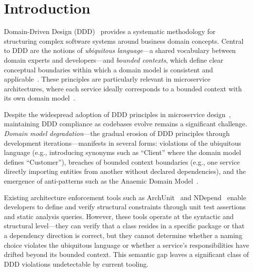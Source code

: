 \documentclass[smallextended]{svjour3}
\begin{document}
\section{Introduction}
\label{sec:intro}

Domain-Driven Design (DDD)~\cite{evans2003ddd} provides a systematic methodology for structuring complex software systems around business domain concepts.
Central to DDD are the notions of \emph{ubiquitous language}---a shared vocabulary between domain experts and developers---and \emph{bounded contexts}, which define clear conceptual boundaries within which a domain model is consistent and applicable~\cite{vernon2013implementing}.
These principles are particularly relevant in microservice architectures, where each service ideally corresponds to a bounded context with its own domain model~\cite{microsoft2024tactical}.

Despite the widespread adoption of DDD principles in microservice design~\cite{loukides2020microservices}, maintaining DDD compliance as codebases evolve remains a significant challenge.
\emph{Domain model degradation}---the gradual erosion of DDD principles through development iterations---manifests in several forms: violations of the ubiquitous language (e.g., introducing synonyms such as ``Client'' where the domain model defines ``Customer''), breaches of bounded context boundaries (e.g., one service directly importing entities from another without declared dependencies), and the emergence of anti-patterns such as the Anaemic Domain Model~\cite{ozkan2023refactoring}.

Existing architecture enforcement tools such as ArchUnit~\cite{archunit2024} and NDepend~\cite{ndepend2024} enable developers to define and verify structural constraints through unit test assertions and static analysis queries.
However, these tools operate at the syntactic and structural level---they can verify that a class resides in a specific package or that a dependency direction is correct, but they cannot determine whether a naming choice violates the ubiquitous language or whether a service's responsibilities have drifted beyond its bounded context.
This semantic gap leaves a significant class of DDD violations undetectable by current tooling.
\end{document}
